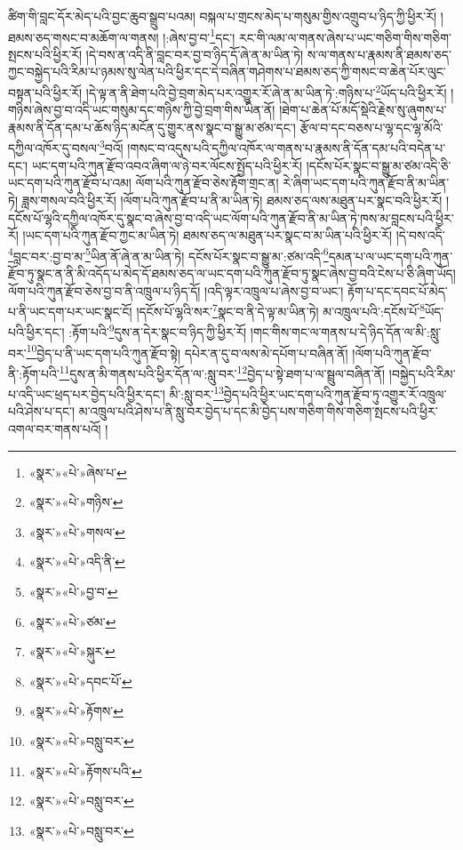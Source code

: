 ཚིག་གི་བླང་དོར་མེད་པའི་བྱང་ཆུབ་སྒྲུབ་པའམ། བསྐལ་པ་གྲངས་མེད་པ་གསུམ་གྱིས་འགྲུབ་པ་ཉིད་ཀྱི་ཕྱིར་རོ། །ཐམས་ཅད་གསང་བ་མཆོག་ལ་གནས། །:ཞེས་བྱ་བ་\footnote{«སྣར་»«པེ་»ཞེས་པ་}དང་། རང་གི་ལམ་ལ་གནས་ཞེས་པ་ཡང་གཅིག་གིས་གཅིག་སྤངས་པའི་ཕྱིར་རོ། །དེ་བས་ན་འདི་ནི་བླང་བར་བྱ་བ་ཉིད་དོ་ཞེ་ན་མ་ཡིན་ཏེ། ས་ལ་གནས་པ་རྣམས་ནི་ཐམས་ཅད་ཀྱང་བསྐྱེད་པའི་རིམ་པ་ཉམས་སུ་ལེན་པའི་ཕྱིར་དང་དེ་བཞིན་གཤེགས་པ་ཐམས་ཅད་ཀྱི་གསང་བ་ཆེན་པོར་ལུང་བསྟན་པའི་ཕྱིར་རོ། །དེ་ལྟ་ན་ནི་ཐེག་པའི་བྱེ་བྲག་མེད་པར་འགྱུར་རོ་ཞེ་ན་མ་ཡིན་ཏེ་:གཉིས་པ་\footnote{«སྣར་»«པེ་»གཉིས་}ཡོད་པའི་ཕྱིར་རོ། །གཉིས་ཞེས་བྱ་བ་འདི་ཡང་གསུམ་དང་གཉིས་ཀྱི་བྱེ་བྲག་གིས་ཡིན་ནོ། །ཐེག་པ་ཆེན་པོ་མདོ་སྡེའི་རྗེས་སུ་ཞུགས་པ་རྣམས་ནི་དོན་དམ་པ་ཆོས་ཉིད་མངོན་དུ་གྱུར་ནས་སྣང་བ་སྒྱུ་མ་ཙམ་དང་། རྩོལ་བ་དང་བཅས་པ་ལྷ་དང་ལྷ་མོའི་དཀྱིལ་འཁོར་དུ་བསལ་\footnote{«སྣར་»«པེ་»གསལ་}བའོ། །གསང་བ་འདུས་པའི་དཀྱིལ་འཁོར་ལ་གནས་པ་རྣམས་ནི་དོན་དམ་པའི་བདེན་པ་དང་། ཡང་དག་པའི་ཀུན་རྫོབ་འབའ་ཞིག་ལ་ཉེ་བར་ལོངས་སྤྱོད་པའི་ཕྱིར་རོ། །དངོས་པོར་སྣང་བ་སྒྱུ་མ་ཙམ་འདི་ཅི་ཡང་དག་པའི་ཀུན་རྫོབ་པ་འམ། ལོག་པའི་ཀུན་རྫོབ་ཅེས་རྟོག་གྲང་ན། རེ་ཞིག་ཡང་དག་པའི་ཀུན་རྫོབ་ནི་མ་ཡིན་ཏེ། ཟླས་གསལ་བའི་ཕྱིར་རོ། །ལོག་པའི་ཀུན་རྫོབ་པ་ནི་མ་ཡིན་ཏེ། ཐམས་ཅད་ལས་མཐུན་པར་སྣང་བའི་ཕྱིར་རོ། །དངོས་པོ་ལྷའི་དཀྱིལ་འཁོར་དུ་སྣང་བ་ཞེས་བྱ་བ་འདི་ཡང་ལོག་པའི་ཀུན་རྫོབ་ནི་མ་ཡིན་ཏེ་ཁས་མ་བླངས་པའི་ཕྱིར་རོ། །ཡང་དག་པའི་ཀུན་རྫོབ་ཀྱང་མ་ཡིན་ཏེ། ཐམས་ཅད་ལ་མཐུན་པར་སྣང་བ་མ་ཡིན་པའི་ཕྱིར་རོ། །དེ་བས་འདི་\footnote{«སྣར་»«པེ་»འདི་ནི་}བླང་བར་:བྱ་བ་མ་\footnote{«སྣར་»«པེ་»བྱ་བ་}ཡིན་ནོ་ཞེ་ན་མ་ཡིན་ཏེ། དངོས་པོར་སྣང་བ་སྒྱུ་མ་:ཙམ་འདི་\footnote{«སྣར་»«པེ་»ཙམ་}དམན་པ་ལ་ཡང་དག་པའི་ཀུན་རྫོབ་ཏུ་སྣང་ན་ནི་མི་འདོད་པ་མེད་དོ་ཐམས་ཅད་ལ་ཡང་དག་པའི་ཀུན་རྫོབ་ཏུ་སྣང་ཞེས་བྱ་བའི་ངེས་པ་ཅི་ཞིག་ཡོད། ལོག་པའི་ཀུན་རྫོབ་ཅེས་བྱ་བ་ནི་འཁྲུལ་པ་ཉིད་དོ། །འདི་ལྟར་འཁྲུལ་པ་ཞེས་བྱ་བ་ཡང་། རྟོག་པ་དང་དབང་པོ་མེད་པ་ནི་ཡང་དག་པར་ཡང་སྣང་ངོ། །དངོས་པོ་ལྷའི་སར་\footnote{«སྣར་»«པེ་»སྐུར་}སྣང་བ་ནི་དེ་ལྟ་མ་ཡིན་ཏེ། མ་འཁྲུལ་པའི་:དངོས་པོ་\footnote{«སྣར་»«པེ་»དབང་པོ་}ཡོད་པའི་ཕྱིར་དང་། :རྟོག་པའི་\footnote{«སྣར་»«པེ་»རྟོགས་}དུས་ན་དེར་སྣང་བ་ཉིད་ཀྱི་ཕྱིར་རོ། །གང་གིས་གང་ལ་གནས་པ་དེ་ཉིད་དོན་ལ་མི་:སླུ་བར་\footnote{«སྣར་»«པེ་»བསླུ་བར་}བྱེད་པ་ནི་ཡང་དག་པའི་ཀུན་རྫོབ་སྟེ། དཔེར་ན་དུ་བ་ལས་མེ་དཔོག་པ་བཞིན་ནོ། །ལོག་པའི་ཀུན་རྫོབ་ནི་:རྟོག་པའི་\footnote{«སྣར་»«པེ་»རྟོགས་པའི་}དུས་ན་མི་གནས་པའི་ཕྱིར་དོན་ལ་:སླུ་བར་\footnote{«སྣར་»«པེ་»བསླུ་བར་}བྱེད་པ་སྟེ་ཐག་པ་ལ་སྦྲུལ་བཞིན་ནོ། །བསྐྱེད་པའི་རིམ་པ་འདི་ཡང་ཕྲད་པར་བྱེད་པའི་ཕྱིར་དང་། མི་:སླུ་བར་\footnote{«སྣར་»«པེ་»བསླུ་བར་}བྱེད་པའི་ཕྱིར་ཡང་དག་པའི་ཀུན་རྫོབ་ཏུ་འགྱུར་རོ་འཁྲུལ་པའི་ཤེས་པ་དང་། མ་འཁྲུལ་པའི་ཤེས་པ་ནི་སླུ་བར་བྱེད་པ་དང་མི་བྱེད་པས་གཅིག་གིས་གཅིག་སྤངས་པའི་ཕྱིར་འགལ་བར་གནས་པའོ། །

